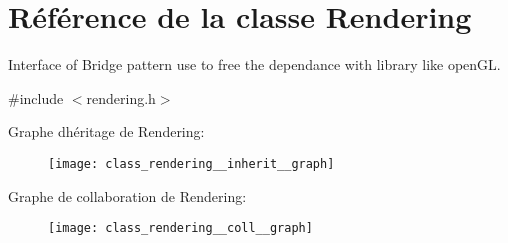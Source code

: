 \hypertarget{class_rendering}{}\section{Référence de la classe Rendering}
\label{class_rendering}


Interface of Bridge pattern use to free the dependance with library like open\+GL.  




{\ttfamily \#include $<$rendering.\+h$>$}



Graphe d\textquotesingle{}héritage de Rendering\+:
\nopagebreak
\begin{figure}[H]
\begin{center}
\leavevmode
\texttt{[image: class\_rendering\_\_inherit\_\_graph]}
\end{center}
\end{figure}


Graphe de collaboration de Rendering\+:\nopagebreak
\begin{figure}[H]
\begin{center}
\leavevmode
\texttt{[image: class\_rendering\_\_coll\_\_graph]}
\end{center}
\end{figure}
